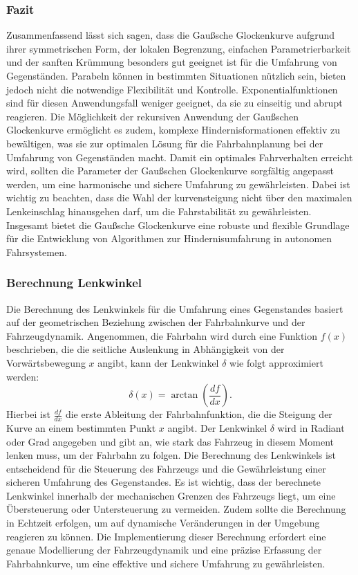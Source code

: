 \subsubsection*{Fazit}
Zusammenfassend lässt sich sagen, dass die Gaußsche Glockenkurve aufgrund ihrer symmetrischen Form, der lokalen Begrenzung, einfachen Parametrierbarkeit und der sanften Krümmung besonders gut geeignet ist für die Umfahrung von Gegenständen. Parabeln können in bestimmten Situationen nützlich sein, bieten jedoch nicht die notwendige Flexibilität und Kontrolle. Exponentialfunktionen sind für diesen Anwendungsfall weniger geeignet, da sie zu einseitig und abrupt reagieren. Die Möglichkeit der rekursiven Anwendung der Gaußschen Glockenkurve ermöglicht es zudem, komplexe Hindernisformationen effektiv zu bewältigen, was sie zur optimalen Lösung für die Fahrbahnplanung bei der Umfahrung von Gegenständen macht.
Damit ein optimales Fahrverhalten erreicht wird, sollten die Parameter der Gaußschen Glockenkurve sorgfältig angepasst werden, um eine harmonische und sichere Umfahrung zu gewährleisten. Dabei ist wichtig zu beachten, dass die  Wahl der kurvensteigung nicht über den maximalen Lenkeinschlag hinausgehen darf, um die Fahrstabilität zu gewährleisten. Insgesamt bietet die Gaußsche Glockenkurve eine robuste und flexible Grundlage für die Entwicklung von Algorithmen zur Hindernisumfahrung in autonomen Fahrsystemen.

\subsubsection{Berechnung Lenkwinkel}
Die Berechnung des Lenkwinkels für die Umfahrung eines Gegenstandes basiert auf der geometrischen Beziehung zwischen der Fahrbahnkurve und der Fahrzeugdynamik. Angenommen, die Fahrbahn wird durch eine Funktion \(f(x)\) beschrieben, die die seitliche Auslenkung in Abhängigkeit von der Vorwärtsbewegung \(x\) angibt, kann der Lenkwinkel \(\delta\) wie folgt approximiert werden:
\[\delta(x) = \arctan\left(\frac{df}{dx}\right).\]
Hierbei ist \(\frac{df}{dx}\) die erste Ableitung der Fahrbahnfunktion, die die Steigung der Kurve an einem bestimmten Punkt \(x\) angibt. Der Lenkwinkel \(\delta\) wird in Radiant oder Grad angegeben und gibt an, wie stark das Fahrzeug in diesem Moment lenken muss, um der Fahrbahn zu folgen.
Die Berechnung des Lenkwinkels ist entscheidend für die Steuerung des Fahrzeugs und die Gewährleistung einer sicheren Umfahrung des Gegenstandes. Es ist wichtig, dass der berechnete Lenkwinkel innerhalb der mechanischen Grenzen des Fahrzeugs liegt, um eine Übersteuerung oder Untersteuerung zu vermeiden. Zudem sollte die Berechnung in Echtzeit erfolgen, um auf dynamische Veränderungen in der Umgebung reagieren zu können. Die Implementierung dieser Berechnung erfordert eine genaue Modellierung der Fahrzeugdynamik und eine präzise Erfassung der Fahrbahnkurve, um eine effektive und sichere Umfahrung zu gewährleisten.

